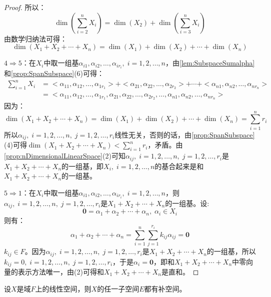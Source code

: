 \begin{proof}
	所以：
	\begin{equation*}
		\dim\left(\sum_{i=2}^{n}X_i\right)
		=\dim(X_2)+\dim\left(\sum_{i=3}^{n}X_i\right)
	\end{equation*}
	由数学归纳法可得：
	\begin{equation*}
		\dim(X_1+X_2+\cdots+X_n)=\dim(X_1)+\dim(X_2)+\cdots+\dim(X_n)
	\end{equation*}\par
	$4\Rightarrow5$：在$X_i$中取一组基$\alpha_{i1},\alpha_{i2},\dots,\alpha_{ir_i},\;i=1,2,\dots,n$，由\cref{lem:SubspaceSumalpha}和\cref{prop:SpanSubspace}(6)可得：
	\begin{align*}
		\sum_{i=1}^{n}X_i
		&=<\alpha_{11},\alpha_{12},\dots,\alpha_{1r_1}>+<\alpha_{21},\alpha_{22},\dots,\alpha_{2r_2}>+\cdots+<\alpha_{n1},\alpha_{n2},\dots,\alpha_{nr_n}> \\
		&=<\alpha_{11},\alpha_{12},\dots,\alpha_{1r_1},\alpha_{21},\alpha_{22},\dots,\alpha_{2r_2},\dots,\alpha_{n1},\alpha_{n2},\dots,\alpha_{nr_n}>
	\end{align*}
	因为：
	\begin{equation*}
		\dim(X_1+X_2+\cdots+X_n)=\dim(X_1)+\dim(X_2)+\cdots+\dim(X_n)=\sum_{i=1}^{n}r_i
	\end{equation*}
	所以$\alpha_{ij},\;i=1,2,\dots,n,\;j=1,2,\dots,r_i$线性无关，否则的话，由\cref{prop:SpanSubspace}(4)可得$\dim(X_1+X_2+\cdots+X_n)<\sum\limits_{i=1}^{n}r_i$，矛盾。由\cref{prop:nDimensionalLinearSpace}(2)可知$\alpha_{ij},\;i=1,2,\dots,n,\;j=1,2,\dots,r_i$是$X_1+X_2+\cdots+X_n$的一组基，即$X_i,\;i=1,2,\dots,n$的基合起来是和$X_1+X_2+\cdots+X_n$的一组基。\par
	$5\Rightarrow1$：在$X_i$中取一组基$\alpha_{i1},\alpha_{i2},\dots,\alpha_{ir_i},\;i=1,2,\dots,n$，则$\alpha_{ij},\;i=1,2,\dots,n,\;j=1,2,\dots,r_i$是$X_1+X_2+\cdots+X_n$的一组基。设:
	\begin{equation*}
		\mathbf{0}=\alpha_1+\alpha_2+\cdots+\alpha_n,\;\alpha_i\in X_i
	\end{equation*}
	则有：
	\begin{equation*}
		\alpha_1+\alpha_2+\cdots+\alpha_n=\sum_{i=1}^{n}\sum_{j=1}^{r_i}k_{ij}\alpha_{ij}=\mathbf{0}
	\end{equation*}
	$k_{ij}\in F$。因为$\alpha_{ij},\;i=1,2,\dots,n,\;j=1,2,\dots,r_i$是$X_1+X_2+\cdots+X_n$的一组基，所以$k_{ij}=0,\;i=1,2,\dots,n,\;j=1,2,\dots,r_i$，于是$\alpha_i=\mathbf{0}$，即和$X_1+X_2+\cdots+X_n$中零向量的表示方法唯一，由(2)可得和$X_1+X_2+\cdots+X_n$是直和。
\end{proof}
\begin{theorem}\label{theo:ExistenceOfComplement}
	设$X$是域$F$上的线性空间，则$X$的任一子空间$E$都有补空间。
\end{theorem}
